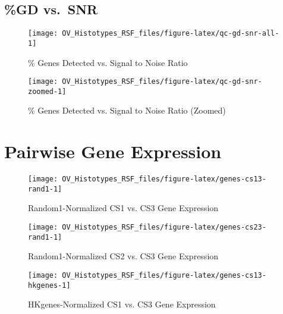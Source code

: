 \documentclass[
]{report}
\begin{document}
\subsection{\%GD vs.~SNR}\label{gd-vs.-snr}

\begin{figure}[H]

{\centering \texttt{[image: OV\_Histotypes\_RSF\_files/figure-latex/qc-gd-snr-all-1]} 

}

\caption{\% Genes Detected vs. Signal to Noise Ratio}\label{fig:qc-gd-snr-all}
\end{figure}

\begin{figure}[H]

{\centering \texttt{[image: OV\_Histotypes\_RSF\_files/figure-latex/qc-gd-snr-zoomed-1]} 

}

\caption{\% Genes Detected vs. Signal to Noise Ratio (Zoomed)}\label{fig:qc-gd-snr-zoomed}
\end{figure}

\section{Pairwise Gene Expression}\label{pairwise-gene-expression}

\begin{figure}[H]

{\centering \texttt{[image: OV\_Histotypes\_RSF\_files/figure-latex/genes-cs13-rand1-1]} 

}

\caption{Random1-Normalized CS1 vs. CS3 Gene Expression}\label{fig:genes-cs13-rand1}
\end{figure}

\begin{figure}[H]

{\centering \texttt{[image: OV\_Histotypes\_RSF\_files/figure-latex/genes-cs23-rand1-1]} 

}

\caption{Random1-Normalized CS2 vs. CS3 Gene Expression}\label{fig:genes-cs23-rand1}
\end{figure}

\begin{figure}[H]

{\centering \texttt{[image: OV\_Histotypes\_RSF\_files/figure-latex/genes-cs13-hkgenes-1]} 

}

\caption{HKgenes-Normalized CS1 vs. CS3 Gene Expression}\label{fig:genes-cs13-hkgenes}
\end{figure}
\end{document}
